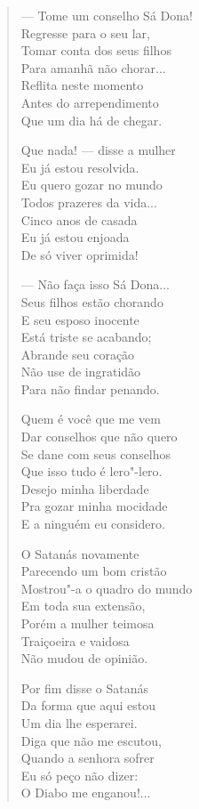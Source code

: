 \begin{verse}
---  Tome um conselho Sá Dona! \\
Regresse para o seu lar, \\
Tomar conta dos seus filhos \\
Para amanhã não chorar... \\
Reflita neste momento \\
Antes do arrependimento \\
Que um dia há de chegar. 

Que nada! ---  disse a mulher \\
Eu já estou resolvida. \\
Eu quero gozar no mundo \\
Todos prazeres da vida... \\
Cinco anos de casada \\
Eu já estou enjoada \\
De só viver oprimida! 

---  Não faça isso Sá Dona... \\
Seus filhos estão chorando \\
E seu esposo inocente \\
Está triste se acabando; \\
Abrande seu coração \\
Não use de ingratidão \\
Para não findar penando. 
\pagebreak

Quem é você que me vem \\
Dar conselhos que não quero \\
Se dane com seus conselhos \\
Que isso tudo é lero"-lero. \\
Desejo minha liberdade \\
Pra gozar minha mocidade \\
E a ninguém eu considero. 

O Satanás novamente \\
Parecendo um bom cristão \\
Mostrou"-a o quadro do mundo \\
Em toda sua extensão, \\
Porém a mulher teimosa \\
Traiçoeira e vaidosa \\
Não mudou de opinião. 

Por fim disse o Satanás \\
Da forma que aqui estou \\
Um dia lhe esperarei. \\
Diga que não me escutou, \\
Quando a senhora sofrer \\
Eu só peço não dizer: \\
O Diabo me enganou!... 


\end{verse}
